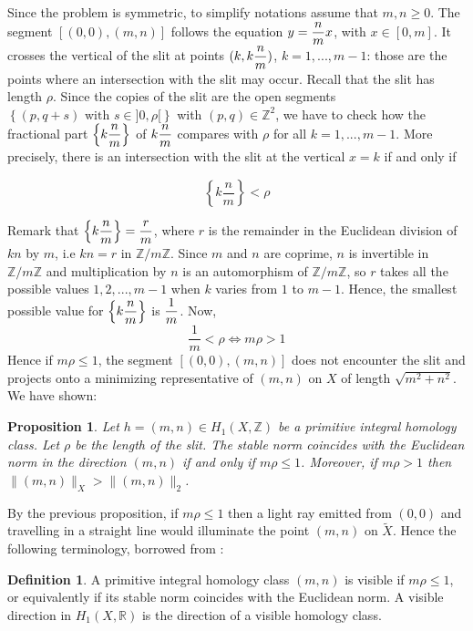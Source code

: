 \documentclass{article}
\newcommand{\RR}{\mathbb{R}}
\newcommand{\ZZ}{\mathbb{Z}}
\newcommand{\St}[1]{\|#1\|_X}
\newtheorem{prop}[thm]{Proposition}
\theoremstyle{definition}
\newtheorem{definition}[thm]{Definition}
\begin{document}
Since the problem is symmetric, to simplify notations assume that $m,n\ge 0$. 
The segment $[(0,0),(m,n)]$ follows the equation $y=\mathlarger{\frac{n}{m}}x$, with $x\in [0,m]$. It crosses the vertical of the slit at points $(k,k\mathlarger{\frac{n}{m}})$, $k=1,...,m-1$: those are the points where an intersection with the slit may occur. Recall that the slit has length $\rho$.
Since the copies of the slit are the open segments $\left \{ (p,q+s) \text{ with } s\in]0,\rho[ \right \}$ with $(p,q)\in \ZZ^2$, we have to check how the fractional part $\left \{ k\mathlarger{\frac{n}{m}} \right \} $ of $ k\mathlarger{\frac{n}{m}} $ compares with $\rho$ for all $k=1,...,m-1$. More precisely, there is an intersection with the slit at the vertical $x=k$ if and only if

$$\left \{ k\frac{n}{m} \right \}< \rho$$

Remark that $\left \{ k\mathlarger{\frac{n}{m}} \right \} = \mathlarger{\frac{r}{m}}$, where $r$ is the remainder in the Euclidean division of $kn$ by $m$, i.e $kn = r$ in $\ZZ / m\ZZ$. Since $m$ and $n$ are coprime, $n$ is invertible in $\ZZ / m\ZZ$ and multiplication by $n$ is an automorphism of $\ZZ /m\ZZ$, so $r$ takes all the possible values $1,2,...,m-1$ when $k$ varies from $1$ to $m-1$. Hence, the smallest possible value for $\left \{ k\mathlarger{\frac{n}{m}} \right \}$ is $\mathlarger{\frac{1}{m}}$. Now, 
$$\frac{1}{m} < \rho \iff m\rho > 1$$
Hence if $m\rho \le 1$, the segment $[(0,0),(m,n)]$ does not encounter the slit and projects onto a minimizing representative of $(m,n)$ on $X$ of length $\sqrt{m^2 + n^2}$. We have shown:

\begin{prop}\label{visible}
	Let $h=(m,n)\in H_1(X,\ZZ)$ be a primitive integral homology class. Let $\rho$ be the length of the slit. The stable norm coincides with the Euclidean norm in the direction $(m,n)$ if and only if $m\rho \le 1$.
	Moreover, if $m\rho > 1$ then $\St{(m,n)} > \|(m,n)\|_2$.
\end{prop}

By the previous proposition, if $m\rho\le 1$ then a light ray emitted from $(0,0)$ and travelling in a straight line would illuminate the point $(m,n)$ on $\tilde{X}$. Hence the following terminology, borrowed from \cite{Har}:

\begin{definition}
    A primitive integral homology class $(m,n)$ is visible if $m\rho \le 1$, or equivalently if its stable norm coincides with the Euclidean norm. A visible direction in $H_1(X,\RR)$ is the direction of a visible homology class.
\end{definition}
\end{document}
